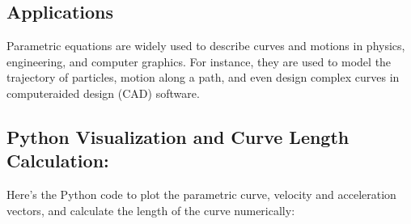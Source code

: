 \documentclass[letterpaper,10pt,english]{jupyterBook}
\begin{document}
\subsection{Applications}
\label{\detokenize{prerequisites:applications}}
\sphinxAtStartPar
Parametric equations are widely used to describe curves and motions in physics, engineering, and computer graphics. For instance, they are used to model the trajectory of particles, motion along a path, and even design complex curves in computer\sphinxhyphen{}aided design (CAD) software.


\subsection{Python Visualization and Curve Length Calculation:}
\label{\detokenize{prerequisites:python-visualization-and-curve-length-calculation}}
\sphinxAtStartPar
Here’s the Python code to plot the parametric curve, velocity and acceleration vectors, and calculate the length of the curve numerically:
\end{document}
